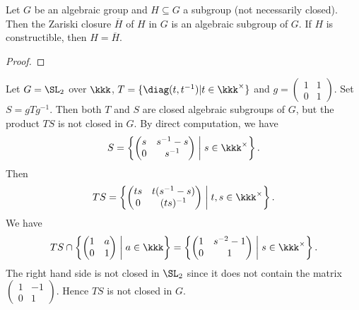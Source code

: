     \begin{proposition}\label{prop:closure_of_subgroup_is_subgroup}
        Let \(G\) be an algebraic group and \(H \subseteq G\) a subgroup (not necessarily closed).
        Then the Zariski closure \(\overline{H}\) of \(H\) in \(G\) is an algebraic subgroup of \(G\).
        If \(H\) is constructible, then \(H = \overline{H}\).
    \end{proposition}
    \begin{proof}
    \end{proof}


    \begin{example}\label{eg:product_of_closed_algebraic_subgroups_which_is_not_closed}
        Let \(G = \SL_2\) over \(\kkk\), \(T = \{\diag(t,t^{-1})|t \in \kkk^\times\}\) and \(g = \begin{pmatrix}
            1 & 1 \\
            0 & 1
        \end{pmatrix}\).
        Set \(S = gTg^{-1}\).
        Then both \(T\) and \(S\) are closed algebraic subgroups of \(G\), but the product \(TS\) is not closed in \(G\).
        By direct computation, we have
        \[ S = \left\{ \begin{pmatrix}
            s & s^{-1}-s \\
            0 & s^{-1}
        \end{pmatrix} \;\middle|\; s \in \kkk^\times \right\}.
        \]
        Then 
        \[ TS = \left\{ \begin{pmatrix}
            ts & t(s^{-1}-s) \\
            0 & (ts)^{-1}
        \end{pmatrix} \;\middle|\; t,s \in \kkk^\times \right\}.
        \]
        We have 
        \[ TS \cap \left\{ \begin{pmatrix}
            1 & a \\
            0 & 1
        \end{pmatrix} \;\middle|\; a \in \kkk \right\} = \left\{ \begin{pmatrix}
            1 & s^{-2}-1 \\
            0 & 1
        \end{pmatrix} \;\middle|\; s \in \kkk^\times \right\}. \]
        The right hand side is not closed in \(\SL_2\) since it does not contain the matrix \(\begin{pmatrix}
            1 & -1 \\
            0 & 1
        \end{pmatrix}\).
        Hence \(TS\) is not closed in \(G\).
    \end{example}

